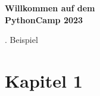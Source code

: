 \documentclass[a4paper]{article}
\title{}
\author{}
\date{2023-06-24}
\newcommand{\name}{PythonCamp 2023}
\newcommand{\BeispielCommand}{1}
\begin{document}

	
	\begin{figure}
		\vspace*{\dimexpr+1cm-\topmargin-\headsep-\headheight-\baselineskip}%
		\hspace*{\dimexpr-1cm-\evensidemargin-\parindent}%
	\end{figure}
	\vspace*{-1cm}
	
	\bigskip
	
	{\centering \bfseries \huge Willkommen auf dem \\ \name \par}

	\bigskip
	{\centering \BeispielCommand. Beispiel 		\par}
	
	\bigskip

	\section{Kapitel 1}
	
	\lipsum[1]
	
	
\end{document}
